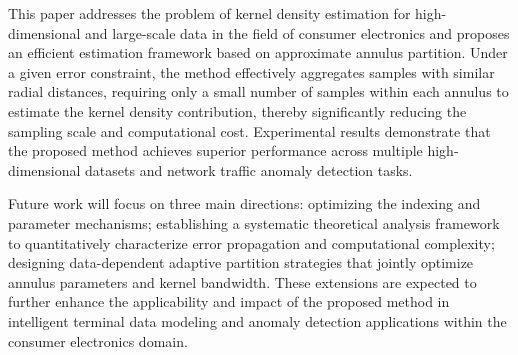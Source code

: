 \documentclass[conference]{IEEEtran}
\begin{document}
This paper addresses the problem of kernel density estimation for high-dimensional and large-scale data in the field of consumer electronics and proposes an efficient estimation framework based on approximate annulus partition. Under a given error constraint, the method effectively aggregates samples with similar radial distances, requiring only a small number of samples within each annulus to estimate the kernel density contribution, thereby significantly reducing the sampling scale and computational cost. Experimental results demonstrate that the proposed method achieves superior performance across multiple high-dimensional datasets and network traffic anomaly detection tasks.

Future work will focus on three main directions: optimizing the indexing and parameter mechanisms; establishing a systematic theoretical analysis framework to quantitatively characterize error propagation and computational complexity; designing data-dependent adaptive partition strategies that jointly optimize annulus parameters and kernel bandwidth. These extensions are expected to further enhance the applicability and impact of the proposed method in intelligent terminal data modeling and anomaly detection applications within the consumer electronics domain.


  
 
\end{document}

